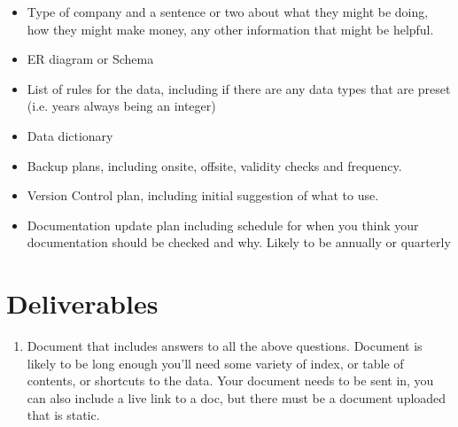 \documentclass[12pt]{article}
\begin{document}
    \begin{itemize}
        \item Type of company and a sentence or two about what they might be doing, how they might make money, any other information that might be helpful.
        \item ER diagram or Schema
        \item List of rules for the data, including if there are any data types that are preset (i.e. years always being an integer)
        \item Data dictionary
        \item Backup plans, including onsite, offsite, validity checks and frequency.
        \item Version Control plan, including initial suggestion of what to use.
        \item Documentation update plan including schedule for when you think  your documentation should be checked and why.  Likely to be annually or quarterly

    \end{itemize}



\section*{Deliverables}
\begin{enumerate}
    \item Document that includes answers to all the above questions.  Document is likely to be long enough you'll need some variety of index, or table of contents, or shortcuts to the data.  Your document needs to be sent in, you can also include a live link to a doc, but there must be a document uploaded that is static.  
\end{enumerate}
\end{document}
